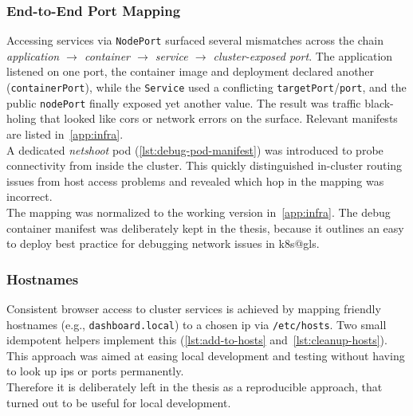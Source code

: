 \documentclass[11pt, a4paper, oneside, listof=totoc]{scrartcl}
\begin{document}
            \subsubsection{End-to-End Port Mapping}\label{subsubsec:e2eportmapping}
                Accessing services via \texttt{NodePort} surfaced several mismatches across the
                chain \emph{application $\rightarrow$ container $\rightarrow$ service $\rightarrow$
                cluster-exposed port}.
                The application listened on one port, the container image and deployment declared
                another (\texttt{containerPort}), while the \texttt{Service} used a conflicting
                \texttt{targetPort}/\texttt{port}, and the public \texttt{nodePort} finally exposed
                yet another value.
                The result was traffic black-holing that looked like \gls{cors} or network errors on
                the surface.
                Relevant manifests are listed in~\autoref{app:infra}.\\
                A dedicated \emph{netshoot} pod (\autoref{lst:debug-pod-manifest}) was introduced to
                probe connectivity from inside the cluster.
                This quickly distinguished in-cluster routing issues from host access problems and
                revealed which hop in the mapping was incorrect.\\
                The mapping was normalized to the working version in~\autoref{app:infra}.
                The debug container manifest was deliberately kept in the thesis, because it
                outlines an easy to deploy best practice for debugging network issues in
                \gls{k8s@gls}.

            \subsubsection{Hostnames}\label{subsubsec:hostnames}
                Consistent browser access to cluster services is achieved by mapping friendly
                hostnames (e.g., \texttt{dashboard.local}) to a chosen \gls{ip} via
                \texttt{/etc/hosts}.
                Two small idempotent helpers implement this
                (\autoref{lst:add-to-hosts} and~\autoref{lst:cleanup-hosts}).
                This approach was aimed at easing local development and testing without having to
                look up \glspl{ip} or ports permanently.\\
                Therefore it is deliberately left in the thesis as a reproducible approach, that
                turned out to be useful for local development.
\end{document}
